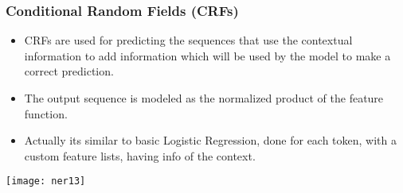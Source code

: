 \begin{frame}[fragile]\frametitle{Conditional Random Fields (CRFs)}
  \begin{itemize}
  \item CRFs are used for predicting the sequences that use the contextual information to add information which will be used by the model to make a correct prediction.
	\item The output sequence is modeled as the normalized product of the feature function.
	\item Actually its similar to basic Logistic Regression, done for each token, with a custom feature lists, having info of the context.
  \end{itemize}
	
	\begin{center}
\texttt{[image: ner13]}
\end{center}
\end{frame}










